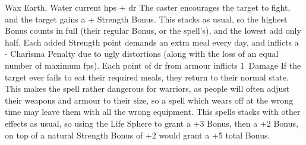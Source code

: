   {}%
  {Wax}%
  {Earth, Water}%
  {current \glspl{hp} + \gls{dr}}%
  {The caster encourages the target to fight, and the target gains a + Strength Bonus.
  This stacks as usual, so the highest Bonus counts in full (their regular Bonus, or the spell's), and the lowest add only half.
  Each added Strength point demands an extra meal every day, and inflicts a - Charisma Penalty due to ugly distortions (along with the loss of an equal number of maximum \glspl{fp}).
  Each point of \gls{dr} from armour inflicts 1~Damage}%
  {
    If the target ever fails to eat their required meals, they return to their normal state.
    This makes the spell rather dangerous for warriors, as people will often adjust their weapons and armour to their size, so a spell which wears off at the wrong time may leave them with all the wrong equipment.
    This spells stacks with other effects as usual, so using the Life Sphere to grant a +3 Bonus, then a +2 Bonus, on top of a natural Strength Bonus of +2 would grant a +5 total Bonus.}
